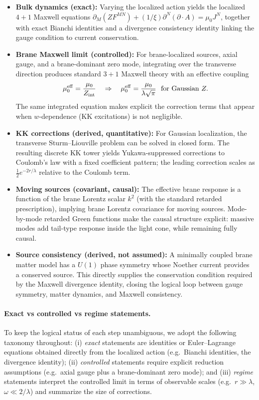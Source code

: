 \documentclass[11pt]{article}
\begin{document}
\begin{itemize}
\item \textbf{Bulk dynamics (exact):} Varying the localized action yields the
localized \(4+1\) Maxwell equations
\(\partial_M(ZF^{MN})+(1/\xi)\partial^N(\partial\!\cdot\!A)=\mu_0 J^N\), together
with exact Bianchi identities and a divergence consistency identity linking the
gauge condition to current conservation.

\item \textbf{Brane Maxwell limit (controlled):} For brane-localized sources,
axial gauge, and a brane-dominant zero mode, integrating over the transverse
direction produces standard \(3+1\) Maxwell theory with an effective coupling
\[
\mu_0^{\rm eff}=\frac{\mu_0}{Z_{\rm int}}
\quad\Rightarrow\quad
\mu_0^{\rm eff}=\frac{\mu_0}{\lambda\sqrt{\pi}}
\ \ \text{for Gaussian } Z.
\]
The same integrated equation makes explicit the correction terms that appear when
\(w\)-dependence (KK excitations) is not negligible.

\item \textbf{KK corrections (derived, quantitative):} For Gaussian localization,
the transverse Sturm--Liouville problem can be solved in closed form. The
resulting discrete KK tower yields Yukawa-suppressed corrections to Coulomb's law
with a fixed coefficient pattern; the leading correction scales as
\(\tfrac12 e^{-2r/\lambda}\) relative to the Coulomb term.

\item \textbf{Moving sources (covariant, causal):} The effective brane response is
a function of the brane Lorentz scalar \(k^2\) (with the standard retarded
prescription), implying brane Lorentz covariance for moving sources. Mode-by-mode
retarded Green functions make the causal structure explicit: massive modes add
tail-type response inside the light cone, while remaining fully causal.

\item \textbf{Source consistency (derived, not assumed):} A minimally coupled
brane matter model has a \(U(1)\) phase symmetry whose Noether current provides a
conserved source. This directly supplies the conservation condition required by
the Maxwell divergence identity, closing the logical loop between gauge symmetry,
matter dynamics, and Maxwell consistency.
\end{itemize}

\paragraph{Exact vs controlled vs regime statements.}
To keep the logical status of each step unambiguous, we adopt the following
taxonomy throughout:
(i) \emph{exact} statements are identities or Euler--Lagrange equations obtained
directly from the localized action (e.g.\ Bianchi identities, the divergence
identity);
(ii) \emph{controlled} statements require explicit reduction assumptions (e.g.\
axial gauge plus a brane-dominant zero mode); and
(iii) \emph{regime} statements interpret the controlled limit in terms of
observable scales (e.g.\ \(r\gg\lambda\), \(\omega\ll 2/\lambda\)) and summarize
the size of corrections.
\end{document}
